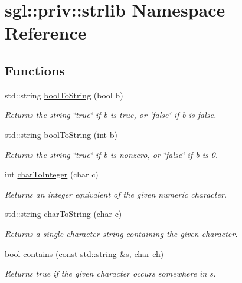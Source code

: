 \hypertarget{namespacesgl_1_1priv_1_1strlib}{}\section{sgl\+:\+:priv\+:\+:strlib Namespace Reference}
\label{namespacesgl_1_1priv_1_1strlib}
\subsection*{Functions}
\begin{DoxyCompactItemize}
\item 
std\+::string \mbox{\hyperlink{namespacesgl_1_1priv_1_1strlib_a16b65d62216f8caae8d5827707e64435}{bool\+To\+String}} (bool b)
\begin{DoxyCompactList}\small\item\em Returns the string \char`\"{}true\char`\"{} if b is true, or \char`\"{}false\char`\"{} if b is false. \end{DoxyCompactList}\item 
std\+::string \mbox{\hyperlink{namespacesgl_1_1priv_1_1strlib_a3300f402b35ce83e6d5c5cf6e072d28f}{bool\+To\+String}} (int b)
\begin{DoxyCompactList}\small\item\em Returns the string \char`\"{}true\char`\"{} if b is nonzero, or \char`\"{}false\char`\"{} if b is 0. \end{DoxyCompactList}\item 
int \mbox{\hyperlink{namespacesgl_1_1priv_1_1strlib_ab5a53662a70083a78e227d1da5ccd5aa}{char\+To\+Integer}} (char c)
\begin{DoxyCompactList}\small\item\em Returns an integer equivalent of the given numeric character. \end{DoxyCompactList}\item 
std\+::string \mbox{\hyperlink{namespacesgl_1_1priv_1_1strlib_afad9c4d2ec707624d928791a48309f1f}{char\+To\+String}} (char c)
\begin{DoxyCompactList}\small\item\em Returns a single-\/character string containing the given character. \end{DoxyCompactList}\item 
bool \mbox{\hyperlink{namespacesgl_1_1priv_1_1strlib_afaddda53f8dbc93d9f3b8955067e92d0}{contains}} (const std\+::string \&s, char ch)
\begin{DoxyCompactList}\small\item\em Returns true if the given character occurs somewhere in s. \end{DoxyCompactList}\item 

\end{DoxyCompactItemize}
